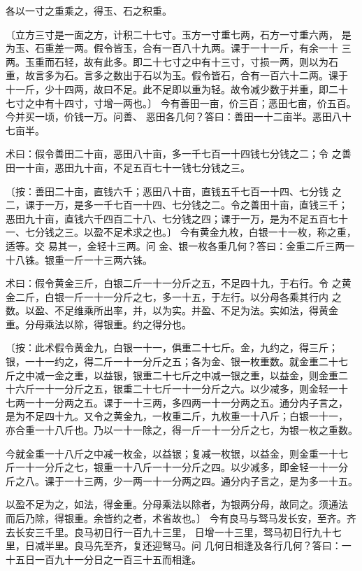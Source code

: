 \documentclass[12pt,UTF8]{ctexbook}
\begin{document}
各以一寸之重乘之，得玉、石之积重。

〔立方三寸是一面之方，计积二十七寸。玉方一寸重七两，石方一寸重六两， 是为玉、石重差一两。假令皆玉，合有一百八十九两。课于一十一斤，有余一十 三两。玉重而石轻，故有此多。即二十七寸之中有十三寸，寸损一两，则以为石 重，故言多为石。言多之数出于石以为玉。假令皆石，合有一百六十二两。课于 十一斤，少十四两，故曰不足。此不足即以重为轻。故令减少数于并重，即二十 七寸之中有十四寸，寸增一两也。〕 今有善田一亩，价三百；恶田七亩，价五百。今并买一顷，价钱一万。问善、 恶田各几何？答曰：善田一十二亩半。恶田八十七亩半。

术曰：假令善田二十亩，恶田八十亩，多一千七百一十四钱七分钱之二；令 之善田一十亩，恶田九十亩，不足五百七十一钱七分钱之三。

〔按：善田二十亩，直钱六千；恶田八十亩，直钱五千七百一十四、七分钱 之二，课于一万，是多一千七百一十四、七分钱之二。令之善田十亩，直钱三千； 恶田九十亩，直钱六千四百二十八、七分钱之四；课于一万，是为不足五百七十 一、七分钱之三。以盈不足术求之也。〕 今有黄金九枚，白银一十一枚，称之重，适等。交 易其一，金轻十三两。问 金、银一枚各重几何？答曰：金重二斤三两一十八铢。银重一斤一十三两六铢。

术曰：假令黄金三斤，白银二斤一十一分斤之五，不足四十九，于右行。令 之黄金二斤，白银一斤一十一分斤之七，多一十五，于左行。以分母各乘其行内 之数。以盈、不足维乘所出率，并，以为实。并盈、不足为法。实如法，得黄金 重。分母乘法以除，得银重。约之得分也。

〔按：此术假令黄金九，白银一十一，俱重二十七斤。金，九约之，得三斤； 银，一十一约之，得二斤一十一分斤之五；各为金、银一枚重数。就金重二十七 斤之中减一金之重，以益银，银重二十七斤之中减一银之重，以益金，则金重二 十六斤一十一分斤之五，银重二十七斤一十一分斤之六。以少减多，则金轻一十 七两一十一分两之五。课于一十三两，多四两一十一分两之五。通分内子言之， 是为不足四十九。又令之黄金九，一枚重二斤，九枚重一十八斤；白银一十一， 亦合重一十八斤也。乃以一十一除之，得一斤一十一分斤之七，为银一枚之重数。

今就金重一十八斤之中减一枚金，以益银；复减一枚银，以益金，则金重一十七 斤一十一分斤之七，银重一十八斤一十一分斤之四。以少减多，即金轻一十一分 斤之八。课于一十三两，少一两一十一分两之四。通分内子言之，是为多一十五。

以盈不足为之，如法，得金重。分母乘法以除者，为银两分母，故同之。须通法 而后乃除，得银重。余皆约之者，术省故也。〕 今有良马与驽马发长安，至齐。齐去长安三千里。良马初日行一百九十三里， 日增一十三里，驽马初日行九十七里，日减半里。良马先至齐，复还迎驽马。问 几何日相逢及各行几何？答曰：一十五日一百九十一分日之一百三十五而相逢。
\end{document}
